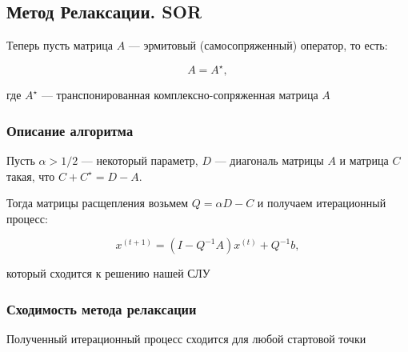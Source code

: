 \subsection{Метод Релаксации. SOR}

Теперь пусть матрица $A$ --- эрмитовый (самосопряженный) оператор, то есть:

\[
A = A^{\star},
\]

где $A^{\star}$ --- транспонированная комплексно-сопряженная матрица $A$

\subsubsection*{Описание алгоритма}

Пусть $\alpha > 1/2$ --- некоторый параметр, $D$ --- диагональ матрицы $A$ и матрица $C$ такая, что $C + C^{\star} = D - A$.

Тогда матрицы расщепления возьмем $Q = \alpha D - C$ и получаем итерационный процесс:

\[
x^{(t+1)} = (I - Q^{-1} A) x^{(t)} + Q^{-1} b,
\]

который сходится к решению нашей СЛУ

\subsubsection*{Сходимость метода релаксации}

\begin{claim}
    Полученный итерационный процесс сходится для любой стартовой точки
\end{claim}

